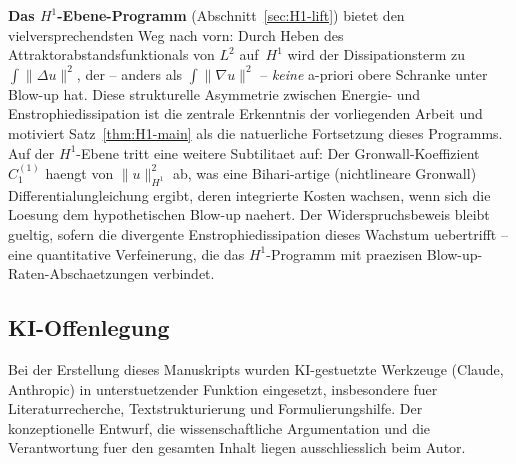 \documentclass[12pt,a4paper]{article}
\theoremstyle{definition}
\theoremstyle{plain}
\theoremstyle{remark}
\begin{document}
\medskip\noindent
\textbf{Das $H^1$-Ebene-Programm} (Abschnitt~\ref{sec:H1-lift})
bietet den vielversprechendsten Weg nach vorn: Durch Heben des
Attraktorabstandsfunktionals von $L^2$ auf~$H^1$ wird der
Dissipationsterm zu $\int\|\Delta u\|^2$, der -- anders als
$\int\|\nabla u\|^2$ -- \emph{keine} a-priori obere Schranke
unter Blow-up hat. Diese strukturelle Asymmetrie zwischen Energie- und
Enstrophiedissipation ist die zentrale Erkenntnis der vorliegenden Arbeit
und motiviert Satz~\ref{thm:H1-main} als die natuerliche
Fortsetzung dieses Programms.
Auf der $H^1$-Ebene tritt eine weitere Subtilitaet auf: Der
Gronwall-Koeffizient $C_1^{(1)}$ haengt von $\|u\|_{H^1}^2$ ab,
was eine Bihari-artige (nichtlineare Gronwall) Differentialungleichung
ergibt, deren integrierte Kosten wachsen, wenn sich die Loesung dem
hypothetischen Blow-up naehert. Der Widerspruchsbeweis bleibt gueltig,
sofern die divergente Enstrophiedissipation dieses Wachstum uebertrifft --
eine quantitative Verfeinerung, die das $H^1$-Programm mit praezisen
Blow-up-Raten-Abschaetzungen verbindet.

\subsection*{KI-Offenlegung}
Bei der Erstellung dieses Manuskripts wurden KI-gestuetzte Werkzeuge (Claude, Anthropic)
in unterstuetzender Funktion eingesetzt, insbesondere fuer Literaturrecherche,
Textstrukturierung und Formulierungshilfe. Der konzeptionelle Entwurf,
die wissenschaftliche Argumentation und die Verantwortung fuer den gesamten Inhalt
liegen ausschliesslich beim Autor.
\end{document}

